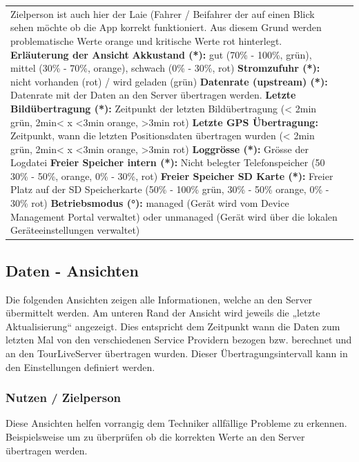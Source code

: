 \begin{longtable}{p{5.5cm} p{6.5cm}}
Zielperson ist auch hier der Laie (Fahrer / Beifahrer der auf einen Blick sehen möchte ob die App korrekt funktioniert.  Aus diesem Grund werden problematische Werte orange und kritische Werte rot hinterlegt. \newline
\textbf{Erläuterung der Ansicht} \newline
\textbf{Akkustand (*):} gut (70\% - 100\%, grün), mittel (30\% - 70\%, orange), schwach (0\% - 30\%, rot)\newline
\textbf{Stromzufuhr (*):} nicht vorhanden (rot) / wird geladen (grün)\newline
\textbf{Datenrate (upstream) (*):} Datenrate mit der Daten an den Server übertragen werden.\newline
\textbf{Letzte Bildübertragung (*):} Zeitpunkt der letzten Bildübertragung (< 2min grün, 2min< x <3min orange, >3min rot)\newline
\textbf{Letzte GPS Übertragung:} Zeitpunkt, wann die letzten Positionsdaten übertragen wurden (< 2min grün, 2min< x <3min orange, >3min rot)\newline
\textbf{Loggrösse (*):} Grösse der Logdatei \newline
\textbf{Freier Speicher intern (*):} Nicht belegter Telefonspeicher (50%
30\% - 50\%, orange, 0\% - 30\%, rot) \newline
\textbf{Freier Speicher SD Karte (*):} Freier Platz auf der SD Speicherkarte (50\% - 100\% grün, 30\% - 50\% orange, 0\% - 30\% rot) \newline
\textbf{Betriebsmodus (°):} managed (Gerät wird vom Device Management Portal verwaltet) oder unmanaged (Gerät wird über die lokalen Geräteeinstellungen verwaltet)
\\

\end{longtable}



\subsection{Daten - Ansichten}
Die folgenden Ansichten zeigen alle Informationen, welche an den Server übermittelt werden. Am unteren Rand der Ansicht wird jeweils die „letzte Aktualisierung“ angezeigt. Dies entspricht dem Zeitpunkt wann die Daten zum letzten Mal von den verschiedenen Service Providern bezogen bzw. berechnet und an den TourLiveServer übertragen wurden. Dieser Übertragungsintervall kann in den Einstellungen definiert werden.

\subsubsection{Nutzen / Zielperson}
Diese Ansichten helfen vorrangig dem Techniker allfällige Probleme zu erkennen. Beispielsweise um zu überprüfen ob  die korrekten Werte an den Server übertragen werden.

